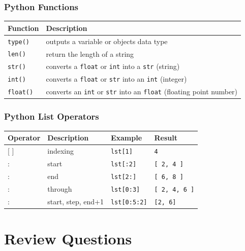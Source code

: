 \documentclass{book}
\begin{document}
\subsubsection{Python Functions}\label{python-functions}

\begin{longtable}[]{@{}ll@{}}
\toprule
Function & Description\tabularnewline
\midrule
\endhead
\lstinline!type()! & outputs a variable or objects data
type\tabularnewline
\lstinline!len()! & return the length of a string\tabularnewline
\lstinline!str()! & converts a \lstinline!float! or \lstinline!int! into
a \lstinline!str! (string)\tabularnewline
\lstinline!int()! & converts a \lstinline!float! or \lstinline!str! into
an \lstinline!int! (integer)\tabularnewline
\lstinline!float()! & converts an \lstinline!int! or \lstinline!str!
into an \lstinline!float! (floating point number)\tabularnewline
\bottomrule
\end{longtable}

\subsubsection{Python List Operators}\label{python-list-operators}

\begin{longtable}[]{@{}llll@{}}
\toprule
Operator & Description & Example & Result\tabularnewline
\midrule
\endhead
{[} {]} & indexing & \lstinline!lst[1]! & \lstinline!4!\tabularnewline
: & start & \lstinline!lst[:2]! & \lstinline![ 2, 4 ]!\tabularnewline
: & end & \lstinline!lst[2:]! & \lstinline![ 6, 8 ]!\tabularnewline
: & through & \lstinline!lst[0:3]! &
\lstinline![ 2, 4, 6 ]!\tabularnewline
: & start, step, end+1 & \lstinline!lst[0:5:2]! &
\lstinline![2, 6]!\tabularnewline
\bottomrule
\end{longtable}
    




    
        \section{Review Questions}\label{review-questions}
    
\end{document}
